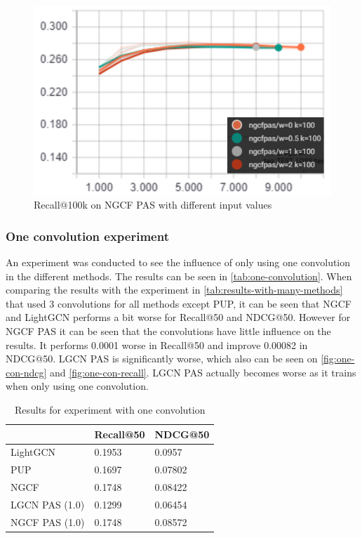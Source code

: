 \begin{figure}
    \includegraphics[width=\linewidth]{figures/graphs/recall-ngcfpas-weights.png}
    \caption{Recall$@$100k on NGCF PAS with different input values}
    \label{fig:recall-ngcfpas-weights}
\end{figure}

\subsubsection{One convolution experiment}
An experiment was conducted to see the influence of only using one convolution in the different methods.
The results can be seen in \autoref{tab:one-convolution}.
When comparing the results with the experiment in \autoref{tab:results-with-many-methods} that used 3 convolutions for all methods except PUP, it can be seen that NGCF and LightGCN performs a bit worse for Recall@50 and NDCG@50.
However for NGCF PAS it can be seen that the convolutions have little influence on the results.
It performs 0.0001 worse in Recall@50 and improve 0.00082 in NDCG@50.
LGCN PAS is significantly worse, which also can be seen on \autoref{fig:one-con-ndcg} and \autoref{fig:one-con-recall}.
LGCN PAS actually becomes worse as it trains when only using one convolution.
\begin{table}[]
    \centering
    \begin{tabular}{|l|l|l|}
        \hline
        \rowcolor[HTML]{FFFFFF}
                       & Recall@50 & NDCG@50 \\ \hline
        LightGCN       & 0.1953    & 0.0957  \\ \hline
        PUP            & 0.1697    & 0.07802 \\ \hline
        NGCF           & 0.1748    & 0.08422 \\ \hline
        LGCN PAS (1.0) & 0.1299    & 0.06454 \\ \hline
        NGCF PAS (1.0) & 0.1748    & 0.08572 \\ \hline
    \end{tabular}
    \caption{Results for experiment with one convolution}
    \label{tab:one-convolution}
\end{table}

